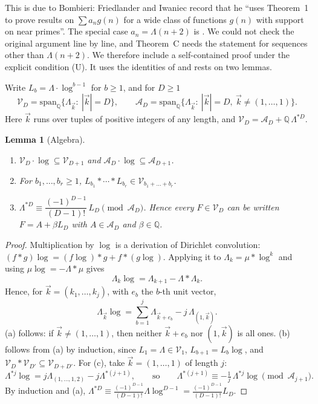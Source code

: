 \documentclass[11pt]{amsart}
\newtheorem{lemma}[theorem]{Lemma}
\theoremstyle{definition}
\theoremstyle{remark}
\begin{document}
This is due to Bombieri: Friedlander and Iwaniec \cite[Remark~I.4]{FI78} record that he ``uses Theorem~1 to prove results on $\sum a_ng(n)$ for a wide class of functions $g(n)$ with support on near primes''. The special case $a_n=\Lambda(n+2)$ is \cite[(7)--(8)]{Tao16notes}. We could not check the original argument line by line, and Theorem~C needs the statement for sequences other than $\Lambda(n+2)$. We therefore include a self-contained proof under the explicit condition (U). It uses the identities of \cite[Lemma~1]{FI78} and rests on two lemmas.

Write $L_b=\Lambda\cdot\log^{b-1}$ for $b\ge1$, and for $D\ge1$
\[
\mathcal V_D=\mathrm{span}_{\mathbb Q}\{\Lambda_{\vec k}:\ |\vec k|=D\},\qquad\mathcal A_D=\mathrm{span}_{\mathbb Q}\{\Lambda_{\vec k}:\ |\vec k|=D,\ \vec k\ne(1,\dots,1)\}.
\]
Here $\vec k$ runs over tuples of positive integers of any length, and $\mathcal V_D=\mathcal A_D+\mathbb Q\,\Lambda^{*D}$.

\begin{lemma}[Algebra]\label{lem:algebra}
\leavevmode
\begin{enumerate}
\item[(a)] $\mathcal V_D\cdot\log\subseteq\mathcal V_{D+1}$ and $\mathcal A_D\cdot\log\subseteq\mathcal A_{D+1}$.
\item[(b)] For $b_1,\dots,b_r\ge1$, $L_{b_1}*\cdots*L_{b_r}\in\mathcal V_{b_1+\dots+b_r}$.
\item[(c)] $\Lambda^{*D}\equiv\dfrac{(-1)^{D-1}}{(D-1)!}\,L_D\pmod{\mathcal A_D}$. Hence every $F\in\mathcal V_D$ can be written $F=A+\beta L_D$ with $A\in\mathcal A_D$ and $\beta\in\mathbb Q$.
\end{enumerate}
\end{lemma}
\begin{proof}
Multiplication by $\log$ is a derivation of Dirichlet convolution: $(f*g)\log=(f\log)*g+f*(g\log)$. Applying it to $\Lambda_k=\mu*\log^k$ and using $\mu\log=-\Lambda*\mu$ gives
\[
\Lambda_k\log=\Lambda_{k+1}-\Lambda*\Lambda_k .
\]
Hence, for $\vec k=(k_1,\dots,k_j)$, with $e_b$ the $b$-th unit vector,
\[
\Lambda_{\vec k}\log=\sum_{b=1}^j\Lambda_{\vec k+e_b}-j\,\Lambda_{(1,\vec k)} .
\]
(a) follows: if $\vec k\ne(1,\dots,1)$, then neither $\vec k+e_b$ nor $(1,\vec k)$ is all ones. (b) follows from (a) by induction, since $L_1=\Lambda\in\mathcal V_1$, $L_{b+1}=L_b\log$, and $\mathcal V_D*\mathcal V_{D'}\subseteq\mathcal V_{D+D'}$. For (c), take $\vec k=(1,\dots,1)$ of length $j$:
\[
\Lambda^{*j}\log=j\Lambda_{(1,\dots,1,2)}-j\Lambda^{*(j+1)},\qquad\text{so}\qquad\Lambda^{*(j+1)}\equiv-\tfrac1j\,\Lambda^{*j}\log\pmod{\mathcal A_{j+1}} .
\]
By induction and (a), $\Lambda^{*D}\equiv\frac{(-1)^{D-1}}{(D-1)!}\Lambda\log^{D-1}=\frac{(-1)^{D-1}}{(D-1)!}L_D$.
\end{proof}
\end{document}
